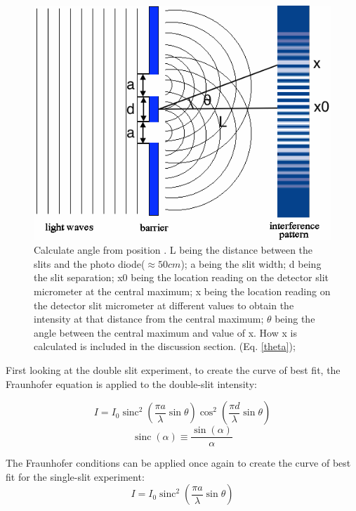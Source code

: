 \documentclass[prb,preprint]{revtex4-1}
\DeclareMathOperator{\sinc}{sinc}
\begin{document}
\begin{figure}[h]
\centering
\includegraphics[width=5in]{interference.png}
\caption{Calculate angle from position \cite{interference}. L being the distance between the slits and the photo diode($\approx50cm$); a being the slit width; d being the slit separation; x0 being the location reading on the detector slit micrometer at the central maximum; x being the location reading on the detector slit micrometer at different values to obtain the intensity at that distance from the central maximum; $\theta$ being the angle between the central maximum and value of x. How x is calculated is included in the discussion section. (Eq. \ref{theta}); }
\label{interference}
\end{figure}

First looking at the double slit experiment, to create the curve of best fit, the Fraunhofer equation is applied to the double-slit intensity: 

\begin{equation}
I=I_0 \sinc^2{\left(\frac{\pi a}{\lambda}\sin{\theta}\right)}  \cos^2{\left(\frac{\pi d}{\lambda} \sin \theta\right)}
\label{eq1}
\end{equation}
\begin{equation*}
\sinc(\alpha) \equiv \frac{\sin(\alpha)}{\alpha}
\end{equation*}

The Fraunhofer conditions can be applied once again to create  the curve of best fit for the single-slit experiment: 
\begin{equation}
I=I_0 \sinc^2 \left(\frac{\pi a}{\lambda} \sin\theta \right)
\label{eq2}
\end{equation}
\end{document}

